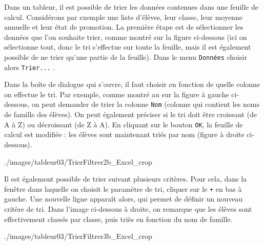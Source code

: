 Dans un tableur, il est possible de trier les données contenues dans une feuille de calcul. Considérons par exemple une liste d'élèves, leur classe, leur moyenne annuelle et leur état de promotion. La première étape est de sélectionner les données que l'on souhaite trier, comme montré sur la figure ci-dessous  (ici on sélectionne tout, donc le tri s'effectue sur toute la feuille, mais il est également possible de ne trier qu'une partie de la feuille). Dans le menu \texttt{Données}  choisir alors \texttt{Trier...} .


Dans la boîte de dialogue qui s'ouvre, il faut choisir en fonction de quelle colonne on effectue le tri. Par exemple, comme montré au  sur la figure à gauche ci-dessous, on peut demander de trier la colonne \texttt{Nom} (colonne qui contient les noms de famille des élèves). On peut également préciser  si le tri doit être croissant (de A à Z) ou décroissant (de Z à A). En cliquant sur le bouton \texttt{OK}, la feuille de calcul est modifiée : les élèves sont maintenant triés par nom (figure à droite ci-dessous).

%
	      {./images/tableur03/TrierFiltrer2b_Excel_crop}{\textwidth}

Il est également possible de trier suivant plusieurs critères. Pour cela, dans la fenêtre dans laquelle on choisit le paramètre de tri, cliquer sur le  \texttt{+} en bas à gauche. Une nouvelle ligne apparaît alors, qui permet de définir un nouveau critère de tri. Dans l'image ci-dessous à droite, on remarque que les élèves sont effectivement classés par classe, puis triès en fonction du nom de famille.

%
{./images/tableur03/TrierFiltrer3b_Excel_crop}{\textwidth}





